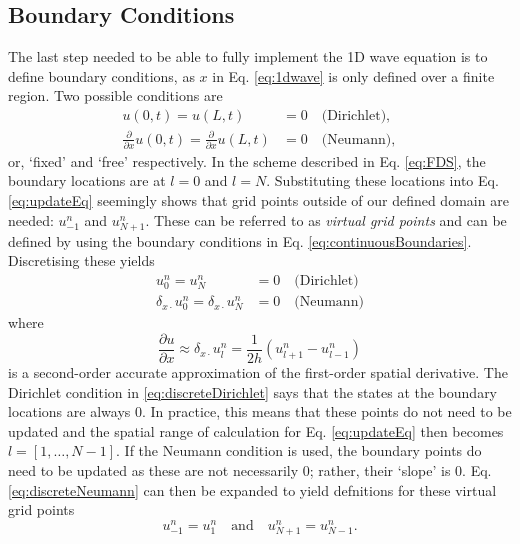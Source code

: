 \documentclass[dvipsnames, preprint]{JASA}
\begin{document}
\subsection{Boundary Conditions}
The last step needed to be able to fully implement the 1D wave equation is to define boundary conditions, as $x$ in Eq. \eqref{eq:1dwave} is only defined over a finite region. Two possible conditions are
\begin{subequations}\label{eq:continuousBoundaries}
    \begin{align}
        u(0, t) = u(L, t) &= 0\quad \text{(Dirichlet)},\label{eq:contDirichlet}\\
        \frac{\partial}{\partial x} u(0, t) = \frac{\partial}{\partial x} u(L, t) &= 0\quad \text{(Neumann)},\label{eq:contNeumann}
    \end{align}
\end{subequations}
or, `fixed' and `free' respectively. In the scheme described in Eq. \eqref{eq:FDS}, the boundary locations are at $l = 0$ and $l = N$. Substituting these locations into Eq. \eqref{eq:updateEq} seemingly shows that grid points outside of our defined domain are needed: $u_{-1}^n$ and $u_{N+1}^n$. These can be referred to as \textit{virtual grid points} and can be defined by using the boundary conditions in Eq. \eqref{eq:continuousBoundaries}. Discretising these yields
\begin{subequations}
    \begin{align}
        u_0^n = u_N^n &= 0 \quad\text{(Dirichlet)}\label{eq:discreteDirichlet}\\
        \delta_{x\cdot} u_0^n = \delta_{x\cdot} u_N^n &= 0 \quad \text{(Neumann)}\label{eq:discreteNeumann}
    \end{align}
\end{subequations}
where 
\begin{equation}
    \frac{\partial u}{\partial x} \approx \delta_{x\cdot}u_l^n = \frac{1}{2h}\left(u_{l+1}^n - u_{l-1}^n\right)
\end{equation}
is a second-order accurate approximation of the first-order spatial derivative. The Dirichlet condition in \eqref{eq:discreteDirichlet} says that the states at the boundary locations are always 0. In practice, this means that these points do not need to be updated and the spatial range of calculation for Eq. \eqref{eq:updateEq} then becomes $l = [1, \hdots, N-1]$. If the Neumann condition is used, the boundary points do need to be updated as these are not necessarily $0$; rather, their `slope' is $0$. Eq. \eqref{eq:discreteNeumann} can then be expanded to yield defnitions for these virtual grid points
\begin{equation}
    u_{-1}^n = u_1^n \quad \text{and} \quad u_{N+1}^n = u_{N-1}^n.
\end{equation}
\end{document}
